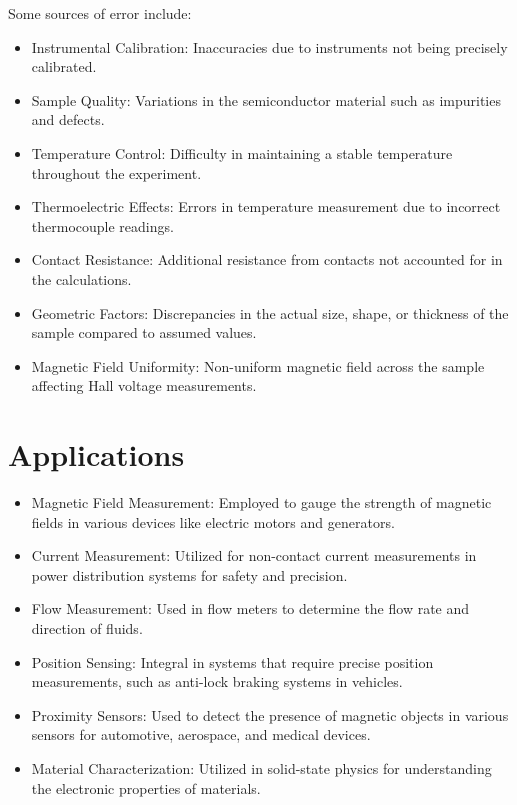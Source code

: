 \documentclass[11pt]{article}
\begin{document}
	Some sources of error include:
	\begin{itemize}
		\item Instrumental Calibration: Inaccuracies due to instruments not being precisely calibrated.
		\item Sample Quality: Variations in the semiconductor material such as impurities and defects.
		\item Temperature Control: Difficulty in maintaining a stable temperature throughout the experiment.
		\item Thermoelectric Effects: Errors in temperature measurement due to incorrect thermocouple readings.
		\item Contact Resistance: Additional resistance from contacts not accounted for in the calculations.
		\item Geometric Factors: Discrepancies in the actual size, shape, or thickness of the sample compared to assumed values.
		\item Magnetic Field Uniformity: Non-uniform magnetic field across the sample affecting Hall voltage measurements.
	\end{itemize}
	
	
	
\clearpage
	
	\section{Applications}
	
	\begin{itemize}
		\item Magnetic Field Measurement: Employed to gauge the strength of magnetic fields in various devices like electric motors and generators.
		\item Current Measurement: Utilized for non-contact current measurements in power distribution systems for safety and precision.
		\item Flow Measurement: Used in flow meters to determine the flow rate and direction of fluids.
		\item Position Sensing: Integral in systems that require precise position measurements, such as anti-lock braking systems in vehicles.
		\item Proximity Sensors: Used to detect the presence of magnetic objects in various sensors for automotive, aerospace, and medical devices.
		\item Material Characterization: Utilized in solid-state physics for understanding the electronic properties of materials.
	\end{itemize}
	
\end{document}
